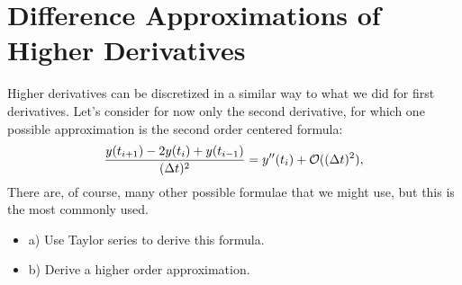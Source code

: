 % 
%
%
%
%
%
%
%
\section{Difference Approximations of Higher Derivatives}
\label{lab2:sec:higher-derivs}

Higher derivatives can be discretized in a similar way to what we did
for first derivatives.
Let's consider for now only the second derivative, for which one
possible approximation is the second order centered formula:
\[
  \frac{y(t_{i+1})-2y(t_i)+y(t_{i-1})}{(\mbox{$\Delta t$}{})^2} = 
  y^{\prime\prime}(t_i) + {\cal O}((\mbox{$\Delta t$}{})^2),
\]
There are, of course, many other possible formulae that we might use,
but this is the most commonly used.

\begin{problem}
  \label{lab2:prob:taylor-higher}
  \begin {itemize}
  \item a)
  Use Taylor series to derive this formula.  
  \item b)
  Derive a higher order approximation.
  \end {itemize}
\end{problem} 

